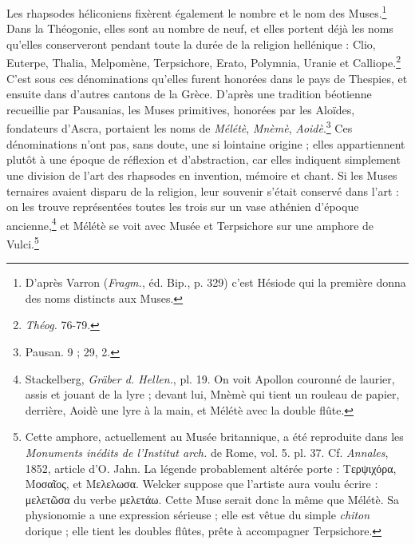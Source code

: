 \documentclass[landscape, a4paper, 11pt, oneside, polutonikogreek, french]{article}
\begin{document}
Les rhapsodes héliconiens fixèrent également le nombre et le nom des Muses.\footnote{D'après Varron (\emph{Fragm.}, éd. Bip., p. 329) c'est Hésiode qui la première donna des noms distincts aux Muses.} Dans la Théogonie, elles sont au nombre de neuf, et elles portent déjà les noms qu'elles conserveront pendant toute la durée de la religion hellénique : Clio, Euterpe, Thalia, Melpomène, Terpsichore, Erato, Polymnia, Uranie et Calliope.\footnote{\emph{Théog.} 76-79.} C'est sous ces dénominations qu'elles furent honorées dans le pays de Thespies, et ensuite dans d'autres cantons de la Grèce. D'après une tradition béotienne recueillie par Pausanias, les Muses primitives, honorées par les Aloïdes, fondateurs d'Ascra, portaient les noms de \emph{Mélétè}, \emph{Mnèmè}, \emph{Aoidè}.\footnote{Pausan. 9 ; 29, 2.} Ces dénominations n'ont pas, sans doute, une si lointaine origine ; elles appartiennent plutôt à une époque de réflexion et d'abstraction, car elles indiquent simplement une division de l'art des rhapsodes en invention, mémoire et chant. Si les Muses ternaires avaient disparu de la religion, leur souvenir s'était conservé dans l'art : on les trouve représentées toutes les trois sur un vase athénien d'époque ancienne,\footnote{Stackelberg, \emph{Gräber d. Hellen.}, pl. 19. On voit Apollon couronné de laurier, assis et jouant de la lyre ; devant lui, Mnèmè qui tient un rouleau de papier, derrière, Aoidè une lyre à la main, et Mélétè avec la double flûte.} et Mélétè se voit avec Musée et Terpsichore sur une amphore de Vulci.\footnote{Cette amphore, actuellement au Musée britannique, a été reproduite dans les \emph{Monuments inédits de l'Institut arch.} de Rome, vol. 5. pl. 37. Cf. \emph{Annales}, 1852, article d'O. Jahn. La légende probablement altérée porte : Τερψιχόρα, Μοσαῖος, et Μελελωσα. Welcker suppose que l'artiste aura voulu écrire : μελετῶσα du verbe μελετάω. Cette Muse serait donc la même que Mélétè. Sa physionomie a une expression sérieuse ; elle est vêtue du simple \emph{chiton} dorique ; elle tient les doubles flûtes, prête à accompagner Terpsichore.}
\end{document}
